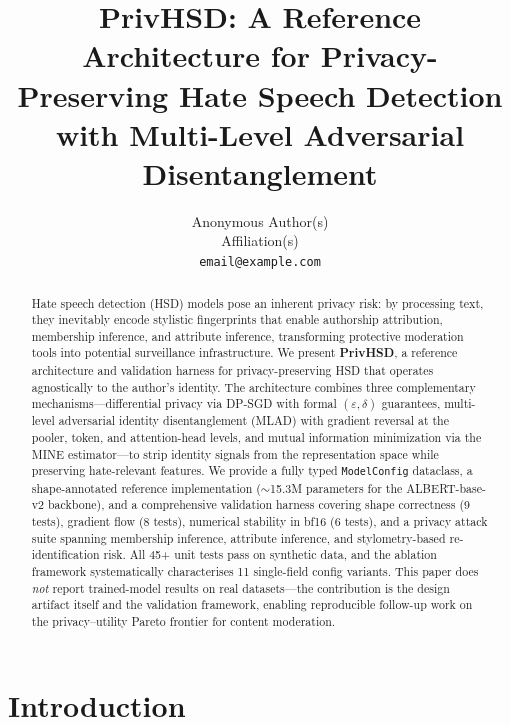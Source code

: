 \documentclass{article}
\title{PrivHSD: A Reference Architecture for Privacy-Preserving Hate Speech Detection
       with Multi-Level Adversarial Disentanglement}
\author{Anonymous Author(s)\\
        Affiliation(s)\\
        \texttt{email@example.com}}
\begin{document}
\maketitle


\begin{abstract}
Hate speech detection (HSD) models pose an inherent privacy risk: by processing
text, they inevitably encode stylistic fingerprints that enable authorship
attribution, membership inference, and attribute inference, transforming
protective moderation tools into potential surveillance infrastructure.
We present \textbf{PrivHSD}, a reference architecture and validation harness for
privacy-preserving HSD that operates agnostically to the author's identity.
The architecture combines three complementary mechanisms---differential privacy
via DP-SGD with formal $(\varepsilon,\delta)$ guarantees, multi-level adversarial
identity disentanglement (MLAD) with gradient reversal at the pooler, token, and
attention-head levels, and mutual information minimization via the MINE
estimator---to strip identity signals from the representation space while
preserving hate-relevant features.
We provide a fully typed \texttt{ModelConfig} dataclass, a shape-annotated
reference implementation ($\sim$15.3M parameters for the ALBERT-base-v2
backbone), and a comprehensive validation harness covering shape correctness (9
tests), gradient flow (8 tests), numerical stability in bf16 (6 tests), and a
privacy attack suite spanning membership inference, attribute inference, and
stylometry-based re-identification risk.
All 45+ unit tests pass on synthetic data, and the ablation framework
systematically characterises 11 single-field config variants.
This paper does \emph{not} report trained-model results on real datasets---the
contribution is the design artifact itself and the validation framework,
enabling reproducible follow-up work on the privacy--utility Pareto
frontier for content moderation.
\end{abstract}


\section{Introduction}
\end{document}
